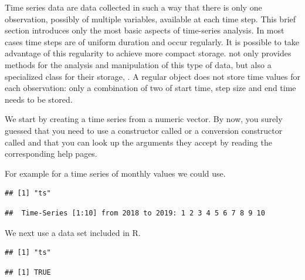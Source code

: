 \documentclass[krantz2]{krantz}\usepackage{knitr}%
\begin{document}
Time series data are data collected in such a way that there is only one observation, possibly of multiple variables, available at each time step. This brief section introduces only the most basic aspects of time-series analysis. In most cases time steps are of uniform duration and occur regularly. It is possible to take advantage of this regularity to achieve more compact storage. \Rlang not only provides methods for the analysis and manipulation of this type of data, but also a specialized class for their storage, . A regular  object does not store time values for each observation: only a combination of two of start time, step size and end time needs to be stored.

We start by creating a time series from a numeric vector. By now, you surely guessed that you need to use a constructor called  or a conversion constructor called  and that you can look up the arguments they accept by reading the corresponding help pages.

For example for a time series of monthly values we could use.

\begin{knitrout}\footnotesize
{}\color{fgcolor}\begin{kframe}
\begin{alltt}
 \hlkwb{<-} \hlstd{(}\hlopt{:}\hlstd{,}  \hlstd{=} \hlstd{,}  \hlstd{=} \hlopt{/}\hlstd{)}
\end{alltt}
\begin{verbatim}
## [1] "ts"
\end{verbatim}
\begin{alltt}
\end{alltt}
\begin{verbatim}
##  Time-Series [1:10] from 2018 to 2019: 1 2 3 4 5 6 7 8 9 10
\end{verbatim}
\end{kframe}
\end{knitrout}

We next use a data set included in R.

\begin{knitrout}\footnotesize
{}\color{fgcolor}\begin{kframe}
\begin{alltt}
\end{alltt}
\begin{verbatim}
## [1] "ts"
\end{verbatim}
\begin{alltt}
\end{alltt}
\begin{verbatim}
## [1] TRUE
\end{verbatim}
\end{kframe}
\end{knitrout}
\end{document}
